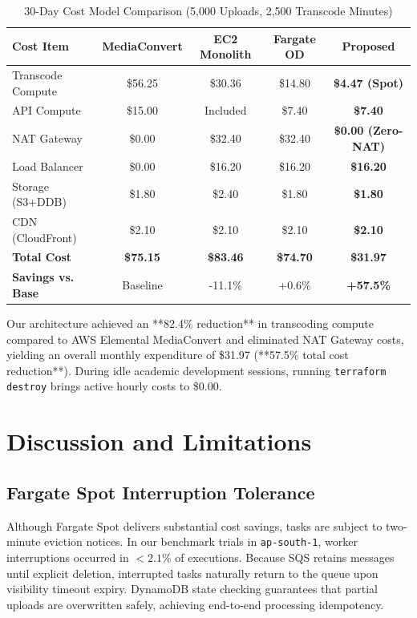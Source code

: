 \documentclass[conference]{IEEEtran}
\begin{document}
\begin{table}[htbp]
\caption{30-Day Cost Model Comparison (5,000 Uploads, 2,500 Transcode Minutes)}
\label{tab:cost}
\begin{center}
\begin{tabular}{lcccc}
\toprule
\textbf{Cost Item} & \textbf{MediaConvert} & \textbf{EC2 Monolith} & \textbf{Fargate OD} & \textbf{Proposed} \\
\midrule
Transcode Compute & \$56.25 & \$30.36 & \$14.80 & \textbf{\$4.47 (Spot)} \\
API Compute & \$15.00 & Included & \$7.40 & \textbf{\$7.40} \\
NAT Gateway & \$0.00 & \$32.40 & \$32.40 & \textbf{\$0.00 (Zero-NAT)} \\
Load Balancer & \$0.00 & \$16.20 & \$16.20 & \textbf{\$16.20} \\
Storage (S3+DDB) & \$1.80 & \$2.40 & \$1.80 & \textbf{\$1.80} \\
CDN (CloudFront) & \$2.10 & \$2.10 & \$2.10 & \textbf{\$2.10} \\
\midrule
\textbf{Total Cost} & \textbf{\$75.15} & \textbf{\$83.46} & \textbf{\$74.70} & \textbf{\$31.97} \\
\textbf{Savings vs. Base} & Baseline & -11.1\% & +0.6\% & \textbf{+57.5\%} \\
\bottomrule
\end{tabular}
\end{center}
\end{table}

Our architecture achieved an **82.4\% reduction** in transcoding compute compared to AWS Elemental MediaConvert and eliminated NAT Gateway costs, yielding an overall monthly expenditure of \$31.97 (**57.5\% total cost reduction**). During idle academic development sessions, running \texttt{terraform destroy} brings active hourly costs to \$0.00.

\section{Discussion and Limitations}

\subsection{Fargate Spot Interruption Tolerance}
Although Fargate Spot delivers substantial cost savings, tasks are subject to two-minute eviction notices. In our benchmark trials in \texttt{ap-south-1}, worker interruptions occurred in $<2.1\%$ of executions. Because SQS retains messages until explicit deletion, interrupted tasks naturally return to the queue upon visibility timeout expiry. DynamoDB state checking guarantees that partial uploads are overwritten safely, achieving end-to-end processing idempotency.
\end{document}
